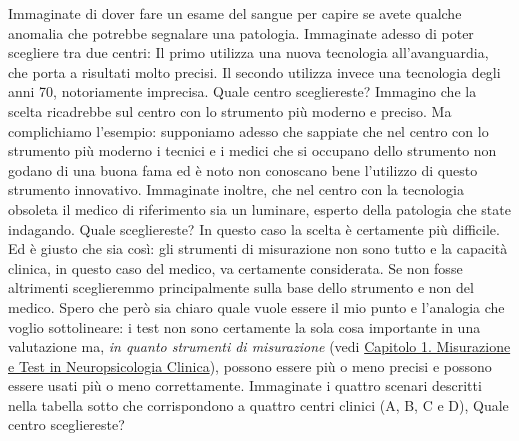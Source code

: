\documentclass[
  italian,
  letterpaper,
  paper=A4,
  headinclude=on,
  footinclude=on,
  12pt]{scrbook}
\begin{document}
Immaginate di dover fare un esame del sangue per capire se avete qualche
anomalia che potrebbe segnalare una patologia. Immaginate adesso di
poter scegliere tra due centri: Il primo utilizza una nuova tecnologia
all'avanguardia, che porta a risultati molto precisi. Il secondo
utilizza invece una tecnologia degli anni 70, notoriamente imprecisa.
Quale centro scegliereste? Immagino che la scelta ricadrebbe sul centro
con lo strumento più moderno e preciso. Ma complichiamo l'esempio:
supponiamo adesso che sappiate che nel centro con lo strumento più
moderno i tecnici e i medici che si occupano dello strumento non godano
di una buona fama ed è noto non conoscano bene l'utilizzo di questo
strumento innovativo. Immaginate inoltre, che nel centro con la
tecnologia obsoleta il medico di riferimento sia un luminare, esperto
della patologia che state indagando. Quale scegliereste? In questo caso
la scelta è certamente più difficile. Ed è giusto che sia così: gli
strumenti di misurazione non sono tutto e la capacità clinica, in questo
caso del medico, va certamente considerata. Se non fosse altrimenti
sceglieremmo principalmente sulla base dello strumento e non del medico.
Spero che però sia chiaro quale vuole essere il mio punto e l'analogia
che voglio sottolineare: i test non sono certamente la sola cosa
importante in una valutazione ma, \emph{in quanto strumenti di
misurazione} (vedi
\hyperref[misurazione-e-test-in-neuropsicologia-clinica]{Capitolo 1.
Misurazione e Test in Neuropsicologia Clinica}), possono essere più o
meno precisi e possono essere usati più o meno correttamente. Immaginate
i quattro scenari descritti nella tabella sotto che corrispondono a
quattro centri clinici (A, B, C e D), Quale centro scegliereste?
\end{document}
